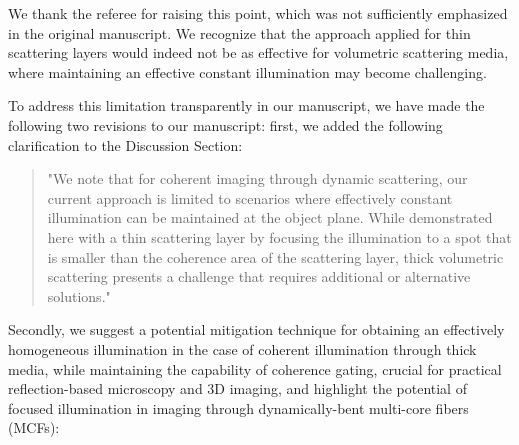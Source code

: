 \documentclass[12pt]{article}
\newenvironment{ourresponse}
    {\begin{tcolorbox}[width=\linewidth,breakable,enhanced,colback=gray!5,colframe=responsecolor!50,title=Response,left=5pt,right=5pt]}
    {\end{tcolorbox}}
\begin{document}
\begin{ourresponse}
    We thank the referee for raising this point, which was not sufficiently emphasized in the original manuscript. 
    We recognize that the approach applied for thin scattering layers would indeed not be as effective for volumetric scattering media, where maintaining an effective constant illumination may become challenging.
    
    To address this limitation transparently in our manuscript, we have made the following two revisions to our manuscript: first, we added the following clarification to the Discussion Section:
    
    \begin{quote}
        "We note that for coherent imaging through dynamic scattering, our current approach is limited to scenarios where effectively constant illumination can be maintained at the object plane. While demonstrated here with a thin scattering layer by focusing the illumination to a spot that is smaller than the coherence area of the scattering layer, thick volumetric scattering presents a challenge that requires additional or alternative solutions."
    \end{quote}
    
     Secondly, we suggest a potential mitigation technique for obtaining an effectively homogeneous illumination in the case of coherent illumination through thick media, while maintaining the capability of coherence gating, crucial for practical reflection-based microscopy and 3D imaging, and highlight the potential of focused illumination in imaging through dynamically-bent multi-core fibers (MCFs):

     \begin{quote}
     

\end{quote}
\end{ourresponse}
\end{document}

